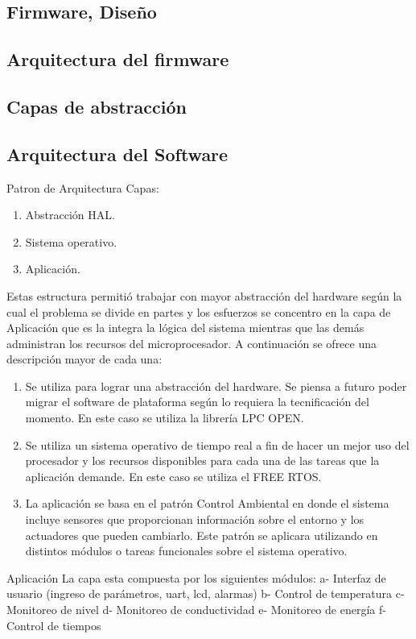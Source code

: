 \subsection{Firmware, Diseño}
\subsection{Arquitectura del firmware}
\subsection{Capas de abstracción}
\subsection{Arquitectura del Software}

Patron de Arquitectura
Capas: 
\begin{enumerate}
	\item Abstracción HAL.
	\item Sistema operativo.
	\item Aplicación.
\end{enumerate}

Estas estructura permitió trabajar con mayor abstracción del hardware según la cual el problema se divide en partes y los esfuerzos se concentro en la capa de Aplicación que es la integra la lógica del sistema mientras que las demás administran los recursos del microprocesador. A continuación se ofrece una descripción mayor de cada una:
\begin{enumerate}
	\item Se utiliza para lograr una abstracción del hardware. Se piensa a futuro poder migrar el software de plataforma según lo requiera la tecnificación del momento. En este caso se utiliza la librería LPC OPEN.

	\item Se utiliza un sistema operativo de tiempo real a fin de hacer un mejor uso del procesador y los recursos disponibles para cada una de las tareas que la aplicación demande. En este caso se utiliza el FREE RTOS.

	\item La aplicación se basa en el patrón Control Ambiental en donde el sistema incluye sensores que proporcionan información sobre el entorno y los actuadores que pueden cambiarlo. Este patrón se aplicara utilizando en distintos módulos o tareas funcionales sobre el sistema operativo.
\end{enumerate}

Aplicación
La capa esta compuesta por los siguientes módulos:
a- Interfaz de usuario (ingreso de parámetros, uart, lcd, alarmas) 
b- Control de temperatura
c- Monitoreo de nivel
d- Monitoreo de conductividad
e- Monitoreo de energía
f- Control de tiempos

